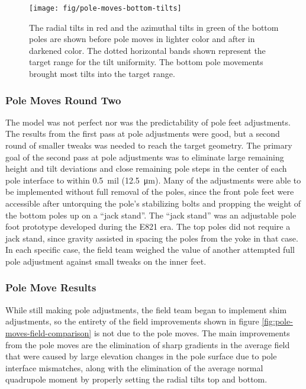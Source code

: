 \begin{figure}
\centering
\texttt{[image: fig/pole-moves-bottom-tilts]}
\caption{
    The radial tilts in red and the azimuthal tilts in green of the bottom poles are shown before pole moves in lighter color and after in darkened color.  The dotted horizontal bands shown represent the target range for the tilt uniformity.  The bottom pole movements brought most tilts into the target range. 
    \label{fig:pole-moves-bottom-tilts}
}
\end{figure}

\subsubsection{Pole Moves Round Two}

The model was not perfect nor was the predictability of pole feet adjustments.  The results from the first pass at pole adjustments were good, but a second round of smaller tweaks was needed to reach the target geometry.  The primary goal of the second pass at pole adjustments was to eliminate large remaining height and tilt deviations and close remaining pole steps in the center of each pole interface to within \SI{0.5}{mil} (\SI{12.5}{\micro\meter}).  Many of the adjustments were able to be implemented without full removal of the poles, since the front pole feet were accessible after untorquing the pole's stabilizing bolts and propping the weight of the bottom poles up on a ``jack stand''.  The ``jack stand'' was an adjustable pole foot prototype developed during the E821 era.  The top poles did not require a jack stand, since gravity assisted in spacing the poles from the yoke in that case.  In each specific case, the field team weighed the value of another attempted full pole adjustment against small tweaks on the inner feet.

\subsubsection{Pole Move Results}

While still making pole adjustments, the field team began to implement shim adjustments, so the entirety of the field improvements shown in figure \ref{fig:pole-moves-field-comparison} is not due to the pole moves.  The main improvements from the pole moves are the elimination of sharp gradients in the average field that were caused by large elevation changes in the pole surface due to pole interface mismatches, along with the elimination of the average normal quadrupole moment by properly setting the radial tilts top and bottom.

